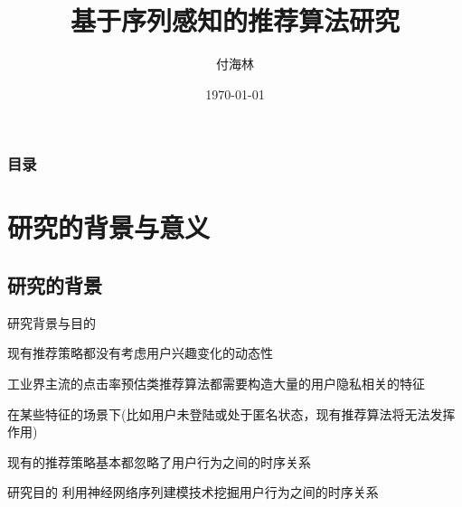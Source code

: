 \documentclass[serif]{beamer}
\title{基于序列感知的推荐算法研究}
\author{付海林}
\institute{计算机学院\\华南师范大学}
\date{\scriptsize {\today}}
\begin{document}
  \begin{frame}
     \titlepage
  \end{frame}

  \begin{frame}\frametitle{目录}
  	\tableofcontents[hideallsubsections]%
  \end{frame}
  
  \section{研究的背景与意义}
  \subsection{研究的背景}
  
  \begin{frame}{研究背景与目的}
      \begin{itemize}
  \small{\item 现有推荐策略都没有考虑用户兴趣变化的动态性
      	     \item 工业界主流的点击率预估类推荐算法都需要构造大量的用户隐私相关的特征
      	     \item 在某些特征的场景下(比如用户未登陆或处于匿名状态，现有推荐算法将无法发挥作用)
      	     \item 现有的推荐策略基本都忽略了用户行为之间的时序关系
      	     }
      \end{itemize}
      \pause
      \begin{block}{研究目的}
      	利用神经网络序列建模技术挖掘用户行为之间的时序关系\\
      \end{block}
  \end{frame}
  
\end{document}
